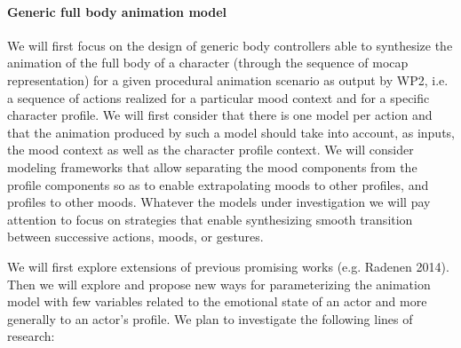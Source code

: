 \paragraph{Generic full body animation model}

We will first focus on the design of generic body controllers able to synthesize the animation of the full body of a character (through the sequence of mocap representation) for a given procedural animation scenario as output by WP2, i.e. a sequence of actions realized for a particular mood context and for a specific character profile. We will first consider that there is one model per action and that the animation produced by such a model should take into account, as inputs, the mood context as well as the character profile context. We will consider modeling frameworks that allow separating the mood components from the profile components so as to enable extrapolating moods to other profiles, and profiles to other moods. Whatever the models under investigation we will pay attention to focus on strategies that enable synthesizing smooth transition between successive actions, moods, or gestures. 

We will first explore extensions of previous promising works (e.g. Radenen 2014). Then we will explore and propose new ways for parameterizing the animation model with few variables related to the emotional state of an actor and more generally to an actor's profile. We plan to investigate the following lines of research:
 
